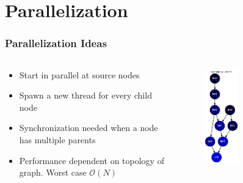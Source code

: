 \section{Parallelization}
\begin{frame}

\frametitle{Parallelization Ideas}
\begin{columns}
  \begin{column}{0.5\textwidth}
    \begin{itemize}
        \item Start in parallel at source nodes
        \item Spawn a new thread for every child node
        \item Synchronization needed when a node has multiple parents
        \item Performance dependent on topology of graph. Worst case $\mathcal{O}(N)$
    \end{itemize}
  \end{column}
  
  \begin{column}{0.5\textwidth}
    \begin{figure}[ht]
    \includegraphics[width=0.4\textwidth]{img/paper}
    \end{figure}
  \end{column}
\end{columns}

\end{frame}

